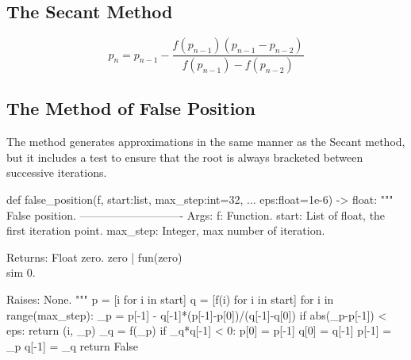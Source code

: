 \subsection{The Secant Method}
\[
p_n=p_{n-1}-\frac{f(p_{n-1})(p_{n-1}-p_{n-2})}{f(p_{n-1})-f(p_{n-2})}
\]

\subsection{The Method of False Position}
The method generates approximations in the same manner as the Secant method, but it includes a test to ensure that the root is always bracketed between successive iterations.
\begin{python}
def false_position(f, start:list, max_step:int=32, ...
    eps:float=1e-6) -> float:
    """
    False position.
    ----------------------------
    Args:
        f: Function.
        start: List of float, the first iteration point.
        max_step: Integer, max number of iteration.

    Returns:
        Float zero.
        zero | fun(zero)\\sim 0.

    Raises:
        None.
    """
    p = [i    for i in start]
    q = [f(i) for i in start]
    for i in range(max_step):
        _p = p[-1] - q[-1]*(p[-1]-p[0])/(q[-1]-q[0])
        if abs(_p-p[-1]) < eps:
            return (i, _p)
        _q = f(_p)
        if _q*q[-1] < 0:
            p[0] = p[-1]
            q[0] = q[-1]
        p[-1] = _p
        q[-1] = _q
    return False
\end{python}
